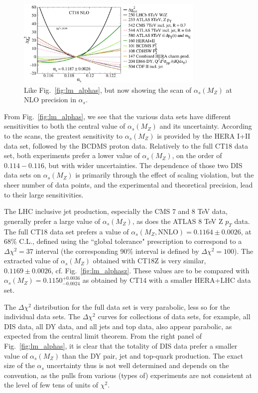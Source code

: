 \begin{figure}[tbp]
\centering
\includegraphics[width=0.8\textwidth]{./fig/LM/i2Tn2as0_11872_DEchi2_re2_ect.pdf}
\caption{
	Like Fig.~\ref{fig:lm_alphas}, but now showing the scan of $\alpha_s(M_Z)$ at NLO precision in $\alpha_s$.
        }
\label{fig:lm_alphas_nlo}
\end{figure}
%

From Fig.~\ref{fig:lm_alphas}, we see that the various data sets
have different sensitivities to both
the central  value of $\alpha_s(M_Z)$ and its uncertainty.  
According to the scans, the greatest sensitivity to $\alpha_s(M_Z)$ is provided by the HERA I+II data set, followed by the BCDMS proton data. Relatively to the full CT18 data set, both experiments prefer a lower value of
$\alpha_s(M_Z)$, on the order of $0.114-0.116$, but with wider uncertainties. The dependence of those two DIS data sets on $\alpha_s(M_Z)$ is primarily through the effect of scaling violation, but the sheer number of data points,
and the experimental and theoretical precision, lead to their large sensitivities. 

The LHC inclusive jet production, especially the CMS 7 and 8 TeV data, generally prefer a large value of $\alpha_s(M_Z)$, as
does the ATLAS 8 TeV Z $p_T$ data. The full CT18 data set prefers a value of $\alpha_s(M_Z, \mbox{NNLO})=0.1164 \pm 0.0026$, at 68\% C.L., defined using the ``global tolerance" prescription to correspond to a $\Delta \chi^2\! =\! 37$ interval
(the corresponding 90\% interval is defined by $\Delta \chi^2\! =\! 100$). The extracted value of $\alpha_s(M_Z)$ obtained with CT18Z is very similar, $0.1169\pm0.0026$, cf. Fig.~\ref{fig:lm_alphasz}. These values are to be
compared with $\alpha_s(M_Z)\!=\!0.1150^{+0.0036}_{-0.0024}$ as obtained by CT14 with a smaller HERA+LHC data set. 

The $\Delta\chi^2$ distribution for the full data set is very
parabolic, less so for the individual data sets. The $\Delta\chi^2$
curves for collections of data sets, for example, all DIS data, all DY
data, and all jets and top data, also appear parabolic, as expected
from the central limit theorem. From the right panel of
Fig.~\ref{fig:lm_alphas}, it is clear that the totality of DIS data
prefer a smaller value of $\alpha_s(M_Z)$  than the DY pair, jet and
top-quark production.  
The exact size of the $\alpha_s$ uncertainty thus is not well
determined and depends on the convention, as the pulls from various
(types of) experiments are not consistent at the level of few tens of
units of $\chi^2$.  

